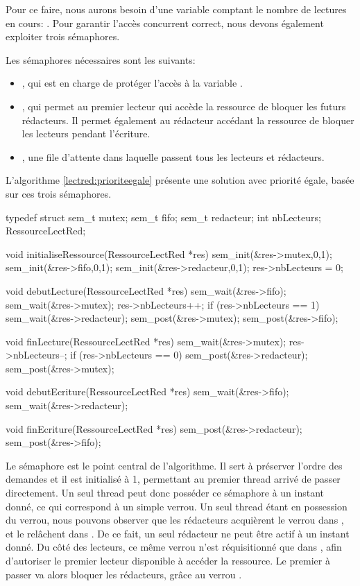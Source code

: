 Pour ce faire, nous aurons besoin d'une variable comptant le nombre de lectures en cours: . Pour garantir l'accès concurrent correct, nous devons également exploiter trois sémaphores.

Les sémaphores nécessaires sont les suivants:
\begin{itemize}
  \item {}, qui est en charge de protéger l'accès à la variable .
  \item {}, qui permet au premier lecteur qui accède la ressource de bloquer les futurs rédacteurs. Il permet également au rédacteur accédant la ressource de bloquer les lecteurs pendant l'écriture.
  \item {}, une file d'attente dans laquelle passent tous les lecteurs et rédacteurs.
\end{itemize}

L'algorithme \ref{lectred:prioriteegale} présente une solution avec priorité égale, basée sur ces trois sémaphores.

\begin{codeblock}[title={Lecteurs-rédacteurs: priorité égal},label=lectred:prioriteegale]
typedef struct {
  sem_t mutex;
  sem_t fifo;
  sem_t redacteur;
  int nbLecteurs;
} RessourceLectRed;

void initialiseRessource(RessourceLectRed *res) {
  sem_init(&res->mutex,0,1);
  sem_init(&res->fifo,0,1);
  sem_init(&res->redacteur,0,1);
  res->nbLecteurs = 0;
}

void debutLecture(RessourceLectRed *res) {
  sem_wait(&res->fifo);
  sem_wait(&res->mutex);
  res->nbLecteurs++;
  if (res->nbLecteurs == 1)
    sem_wait(&res->redacteur);
  sem_post(&res->mutex);
  sem_post(&res->fifo);
}

void finLecture(RessourceLectRed *res) {
  sem_wait(&res->mutex);
  res->nbLecteurs--;
  if (res->nbLecteurs == 0)
    sem_post(&res->redacteur);
  sem_post(&res->mutex);
}

void debutEcriture(RessourceLectRed *res) {
  sem_wait(&res->fifo);
  sem_wait(&res->redacteur);
}

void finEcriture(RessourceLectRed *res) {
  sem_post(&res->redacteur);
  sem_post(&res->fifo);
}
\end{codeblock}

Le sémaphore  est le point central de l'algorithme. Il sert à préserver l'ordre des demandes et il est initialisé à 1, permettant au premier thread arrivé de passer directement. Un seul thread peut donc posséder ce sémaphore à un instant donné, ce qui correspond à un simple verrou. Un seul thread étant en possession du verrou, nous pouvons observer que les rédacteurs acquièrent le verrou dans , et le relâchent dans . De ce fait, un seul rédacteur ne peut être actif à un instant donné. Du côté des lecteurs, ce même verrou n'est réquisitionné que dans , afin d'autoriser le premier lecteur disponible à accéder la ressource. Le premier à passer va alors bloquer les rédacteurs, grâce au verrou .

